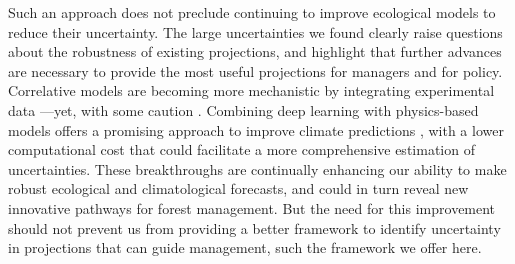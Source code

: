 \documentclass[11pt,letter]{article}
\begin{document}
Such an approach does not preclude continuing to improve ecological models to reduce their uncertainty. 
The large uncertainties we found clearly raise questions about the robustness of existing projections, and highlight that further advances are necessary to provide the most useful projections for managers and for policy. 
Correlative models are becoming more mechanistic by integrating experimental data \citep{Wagner2023}---yet, with some caution \citep{Chevalier2024a}. Combining deep learning with physics-based models offers a promising approach to improve climate predictions \citep{Kochkov2024}, with a lower computational cost that could facilitate a more comprehensive estimation of uncertainties. These breakthroughs are continually enhancing our ability to make robust ecological and climatological forecasts, and could in turn reveal new innovative pathways for forest management. But the need for this improvement should not prevent us from providing a better framework to identify uncertainty in projections that can guide management, such the framework we offer here.  %
\end{document}
